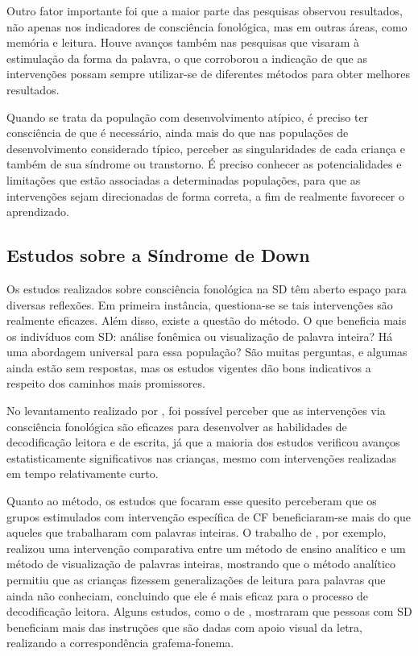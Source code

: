 \documentclass[output=paper,colorlinks,citecolor=brown,booklanguage=portuguese]{langscibook}
\begin{document}
Outro fator importante foi que a maior parte das pesquisas observou resultados, não apenas nos indicadores de consciência fonológica, mas em outras áreas, como memória e leitura. Houve avanços também nas pesquisas que visaram à estimulação da forma da palavra, o que corroborou a indicação de que as intervenções possam sempre utilizar-se de diferentes métodos para obter melhores resultados.

Quando se trata da população com desenvolvimento atípico, é preciso ter consciência de que é necessário, ainda mais do que nas populações de desenvolvimento considerado típico, perceber as singularidades de cada criança e também de sua síndrome ou transtorno. É preciso conhecer as potencialidades e limitações que estão associadas a determinadas populações, para que as intervenções sejam direcionadas de forma correta, a fim de realmente favorecer o aprendizado. 

\subsection{Estudos sobre a Síndrome de Down}

Os estudos realizados sobre consciência fonológica na SD têm aberto espaço para diversas reflexões. Em primeira instância, questiona-se se tais intervenções são realmente eficazes. Além disso, existe a questão do método. O que beneficia mais os indivíduos com SD: análise fonêmica ou visualização de palavra inteira? Há uma abordagem universal para essa população? São muitas perguntas, e algumas ainda estão sem respostas, mas os estudos vigentes dão bons indicativos a respeito dos caminhos mais promissores.

No levantamento realizado por \citet{Marques2018}, foi possível perceber que as intervenções via consciência fonológica são eficazes para desenvolver as habilidades de decodificação leitora e de escrita, já que a maioria dos estudos verificou avanços estatisticamente significativos nas crianças, mesmo com intervenções realizadas em tempo relativamente curto.

Quanto ao método, os estudos que focaram esse quesito perceberam que os grupos estimulados com intervenção específica de CF beneficiaram-se mais do que aqueles que trabalharam com palavras inteiras. O trabalho de \citet{Cupples2002}, por exemplo, realizou uma intervenção comparativa entre um método de ensino analítico e um método de visualização de palavras inteiras, mostrando que o método analítico permitiu que as crianças fizessem generalizações de leitura para palavras que ainda não conheciam, concluindo que ele é mais eficaz para o processo de decodificação leitora. Alguns estudos, como o de \citet{Murray1996}, mostraram que pessoas com SD beneficiam mais das instruções que são dadas com apoio visual da letra, realizando a correspondência grafema-fonema. 
\end{document}
